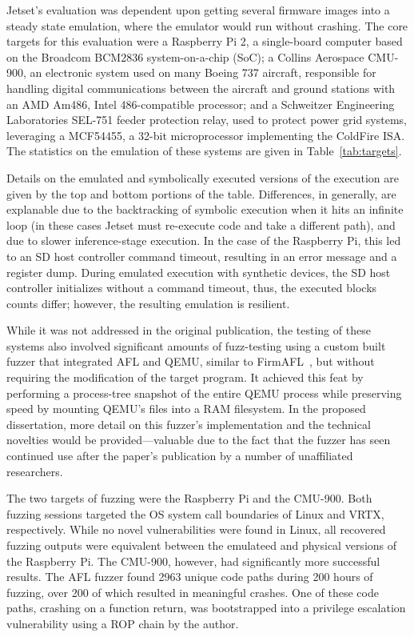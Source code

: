 Jetset's evaluation was dependent upon getting several firmware images into a steady state emulation, where the emulator would run without crashing.
The core targets for this evaluation were a Raspberry Pi 2, a single-board computer based on the Broadcom BCM2836 system-on-a-chip (SoC); a Collins Aerospace CMU-900, an electronic system used on many Boeing 737 aircraft, responsible for handling digital communications between the aircraft and ground stations with an AMD Am486, Intel 486-compatible processor; and a Schweitzer Engineering Laboratories SEL-751 feeder protection relay, used to protect power grid systems, leveraging a MCF54455, a 32-bit microprocessor implementing the ColdFire ISA.
The statistics on the emulation of these systems are given in Table~\ref{tab:targets}.

Details on the emulated and symbolically executed versions of the execution are given by the top and bottom portions of the table. 
Differences, in generally, are explanable due to the backtracking of symbolic execution when it hits an infinite loop (in these cases Jetset must re-execute code and take a different path), and due to slower inference-stage execution.
In the case of the Raspberry Pi, this led to an SD host controller command timeout, resulting in an error message and a register dump. 
During emulated execution with synthetic devices, the SD host controller initializes without a command timeout, thus, the executed blocks counts differ; however, the resulting emulation is resilient. 

While it was not addressed in the original publication, the testing of these systems also involved significant amounts of fuzz-testing using a custom built fuzzer that integrated AFL and QEMU, similar to FirmAFL~\cite{zheng2019firm}, but without requiring the modification of the target program.
It achieved this feat by performing a process-tree snapshot of the entire QEMU process while preserving speed by mounting QEMU's files into a RAM filesystem.
In the proposed dissertation, more detail on this fuzzer's implementation and the technical novelties would be provided---valuable due to the fact that the fuzzer has seen continued use after the paper's publication by a number of unaffiliated researchers.

The two targets of fuzzing were the Raspberry Pi and the CMU-900.
Both fuzzing sessions targeted the OS system call boundaries of Linux and VRTX, respectively.
While no novel vulnerabilities were found in Linux, all recovered fuzzing outputs were equivalent between the emulateed and physical versions of the Raspberry Pi.
The CMU-900, however, had significantly more successful results.
The AFL fuzzer found 2963 unique code paths during 200 hours of fuzzing, over 200 of which resulted in meaningful crashes.
One of these code paths, crashing on a function return, was bootstrapped into a privilege escalation vulnerability using a ROP chain by the author.

